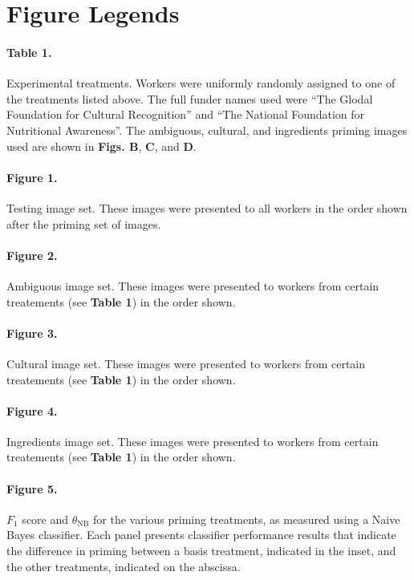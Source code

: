 \documentclass[a4paper]{report}
\begin{document}
\section*{Figure Legends}

\paragraph{Table 1.}
	Experimental treatments.  Workers were uniformly randomly
	assigned to one of the treatments listed above.  The full funder 
	names used were ``The Glodal Foundation
	for Cultural Recognition'' and ``The National Foundation for 
	Nutritional Awareness''.  The ambiguous, cultural, and ingredients 
	priming images used are shown in \textbf{Figs. B}, \textbf{C}, and 
	\textbf{D}.

\paragraph{Figure 1.}
	Testing image set. These images were presented to all workers in the order 
	shown after the priming set of images. 

\paragraph{Figure 2.}
	Ambiguous image set. These images were presented to workers from certain
	treatements (see \textbf{Table 1}) in the order shown.  

\paragraph{Figure 3.}
	Cultural image set. These images were presented to workers from certain
	treatements (see \textbf{Table 1}) in the order shown.  

\paragraph{Figure 4.}
	Ingredients image set. These images were presented to workers from certain
	treatements (see \textbf{Table 1}) in the order shown.  

\paragraph{Figure 5.}
$F_1$ score and $\theta_\text{NB}$ for the various 
priming treatments, as measured using a Naive Bayes classifier. Each panel 
presents classifier performance results that indicate the difference in
priming between a basis 
treatment, indicated in the inset, and the other treatments, indicated on the
abscissa.
\end{document}

